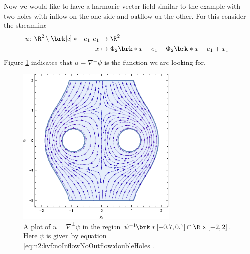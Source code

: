Now we would like to have a harmonic vector field similar to the example with two holes with
inflow on the one side and outflow on the other. 
For this consider the streamline
\begin{equation}
  \begin{aligned}
  u\colon\R^2\setminus\brk[c]*{-e_1,e_1}&\to\R^2 \\
  x&\mapsto\Phi_2\brk*{x-e_1}-\Phi_2\brk*{x+e_1}+x_1
  \end{aligned}\label{eq:n2:hvf:noInflowNoOutflow:doubleHoles}
\end{equation}
Figure \ref{pl:n2_hvf_InflowOutflow_symmetric_region} indicates that $u=\nabla^\perp\psi$ is the function
we are looking for.
\begin{figure}
  \centering
  \includegraphics[width=0.7\textwidth]{../Plots/HarmonicVectorFields_gr2.eps}
  \caption{A plot of $u=\nabla^\perp\psi$ in the region $\psi^{-1}\brk*{[-0.7,0.7]}\cap \R\times[-2,2]$.
  Here $\psi$ is given by equation \eqref{eq:n2:hvf:noInflowNoOutflow:doubleHoles}.}
  \label{pl:n2_hvf_InflowOutflow_symmetric_region}
\end{figure}


